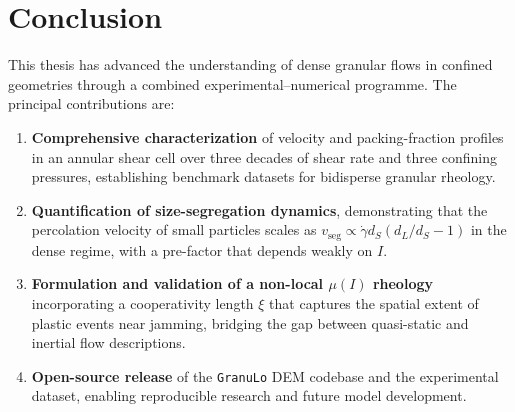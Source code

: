 \chapter{Conclusion}

This thesis has advanced the understanding of dense granular flows in confined geometries through a combined experimental--numerical programme. The principal contributions are:

\begin{enumerate}[leftmargin=*,label=\textbullet]
  \item \textbf{Comprehensive characterization} of velocity and packing-fraction profiles in an annular shear cell over three decades of shear rate and three confining pressures, establishing benchmark datasets for bidisperse granular rheology.
  \item \textbf{Quantification of size-segregation dynamics}, demonstrating that the percolation velocity of small particles scales as $v_{\text{seg}} \propto \dot{\gamma} d_S (d_L/d_S - 1)$ in the dense regime, with a pre-factor that depends weakly on $I$.
  \item \textbf{Formulation and validation of a non-local $\mu(I)$ rheology} incorporating a cooperativity length $\xi$ that captures the spatial extent of plastic events near jamming, bridging the gap between quasi-static and inertial flow descriptions.
  \item \textbf{Open-source release} of the \texttt{GranuLo} DEM codebase and the experimental dataset, enabling reproducible research and future model development.
\end{enumerate}
